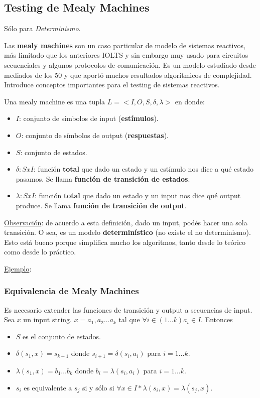 \documentclass[]{article}
\begin{document}

\subsection{Testing de Mealy Machines}
Sólo para \emph{Determinismo}.

Las \textbf{mealy machines} son un caso particular de modelo de sistemas reactivos, más limitado que los anteriores IOLTS y sin embargo muy usado para circuitos secuenciales y algunos protocolos de comunicación. Es un modelo estudiado desde mediados de los 50 y que aportó muchos resultados algorítmicos de complejidad. Introduce conceptos importantes para el testing de sistemas reactivos.

Una mealy machine es una tupla $L=<I,O,S,\delta,\lambda>$ en donde:
\begin{itemize}
	\item $I$: conjunto de símbolos de input (\textbf{estímulos}).
	\item $O$: conjunto de símbolos de output (\textbf{respuestas}).
	\item $S$: conjunto de estados.
	\item $\delta: SxI$: función \textbf{total} que dado un estado y un estímulo nos dice a qué estado pasamos. Se llama \textbf{función de transición de estados}.
	\item $\lambda: SxI$: función \textbf{total} que dado un estado y un input nos dice qué output produce. Se llama \textbf{función de transición de output}.
\end{itemize}

\underline{Observación}: de acuerdo a esta definición, dado un input, podés hacer una sola transición. O sea, es un modelo \textbf{determinístico} (no existe el no determinismo). Esto está bueno porque simplifica mucho los algoritmos, tanto desde lo teórico como desde lo práctico.

\underline{Ejemplo}:

\subsubsection{Equivalencia de Mealy Machines}
Es necesario extender las funciones de transición y output a secuencias de input. Sea $x$ un input string. $x=a_1,a_2\hdots a_k$ tal que $\forall i\in(1 \hdots k) a_i\in I$. Entonces
\begin{itemize}
	\item $S$ es el conjunto de estados.
	\item $\delta(s_1,x)=s_{k+1}$ donde $s_{i+1} = \delta(s_i,a_i)$ para $i=1\hdots k$.
	\item $\lambda(s_1,x) = b_1\hdots b_k$ donde $b_i = \lambda(s_i,a_i)$ para $i=1\hdots k$.
	\item $s_i$ es equivalente a $s_j$ si y sólo si $\forall x\in I* \lambda(s_i,x)=\lambda(s_j,x)$.
\end{itemize}
\end{document}
